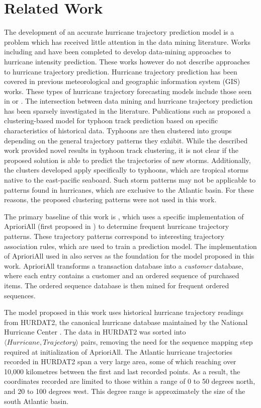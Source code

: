 \documentclass[12pt,conference]{IEEEtran}
\begin{document}
\section{Related Work}

The development of an accurate hurricane trajectory prediction model is a problem which has received little attention in the data mining literature. Works including \cite{hurricane-intensity-1} and \cite{hurricane-intensity-2} have been completed to develop data-mining approaches to hurricane intensity prediction. These works however do not describe approaches to hurricane trajectory prediction. Hurricane trajectory prediction has been covered in previous meteorological and geographic information system (GIS) works. These types of hurricane trajectory forecasting models include those seen in \cite{hurricane-forecasting-1} or \cite{hurricane-forecasting-2}. The intersection between data mining and hurricane trajectory prediction has been sparsely investigated in the literature. Publications such as \cite{typhoon-clustering} proposed a clustering-based model for typhoon track prediction based on specific characteristics of historical data. Typhoons are then clustered into groups depending on the general trajectory patterns they exhibit. While the described work provided novel results in typhoon track clustering, it is not clear if the proposed solution is able to predict the trajectories of new storms. Additionally, the clusters developed apply specifically to typhoons, which are tropical storms native to the east-pacific seaboard. Such storm patterns may not be applicable to patterns found in hurricanes, which are exclusive to the Atlantic basin. For these reasons, the proposed clustering patterns were not used in this work.

The primary baseline of this work is \cite{major-hurricane-model}, which uses a specific implementation of AprioriAll (first proposed in \cite{AprioriAll-original}) to determine frequent hurricane trajectory patterns. These trajectory patterns correspond to interesting trajectory association rules, which are used to train a prediction model. The implementation of AprioriAll used in \cite{major-hurricane-model} also serves as the foundation for the model proposed in this work. AprioriAll transforms a transaction database into a \textit{customer} database, where each entry contains a customer and an ordered sequence of purchased items. The ordered sequence database is then mined for frequent ordered sequences.

The model proposed in this work uses historical hurricane trajectory readings from HURDAT2, the canonical hurricane database maintained by the National Hurricane Center \cite{HURDAT2-original}. The data in HURDAT2 was sorted into $\langle Hurricane, Trajectory \rangle$ pairs, removing the need for the sequence mapping step required at initialization of AprioriAll. The Atlantic hurricane trajectories recorded in HURDAT2 span a very large area, some of which reaching over 10,000 kilometres between the first and last recorded points. As a result, the coordinates recorded are limited to those within a range of 0 to 50 degrees north, and 20 to 100 degrees west. This degree range is approximately the size of the south Atlantic basin.
\end{document}
